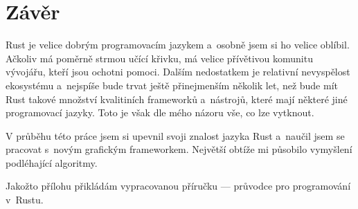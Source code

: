 \documentclass[a4paper, 12pt, twoside]{article} %
\begin{document}
\section{Závěr}
	Rust je velice dobrým programovacím jazykem a~osobně jsem si ho velice oblíbil. Ačkoliv má poměrně strmou učící křivku, má velice přívětivou komunitu vývojářu, kteří jsou ochotni pomoci. Dalším nedostatkem je relativní nevyspělost ekosystému a~nejspíše bude trvat ještě přinejmenším několik let, než bude mít Rust takové množství kvalitiních frameworků a~nástrojů, které mají některé jiné programovací jazyky. Toto je však dle mého názoru vše, co lze vytknout.
	
	V průběhu této práce jsem si upevnil svoji znalost jazyka Rust a~naučil jsem se pracovat s~novým grafickým frameworkem. Největší obtíže mi působilo vymyšlení podléhající algoritmy.
	
	Jakožto přílohu přikládám vypracovanou příručku — průvodce pro programování v~Rustu.



\end{document}
